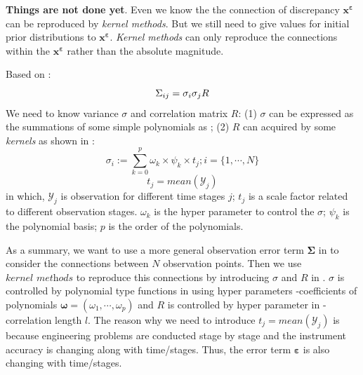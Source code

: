 \documentclass{ol-softwaremanual}
\begin{document}
\textbf{Things are not done yet}. Even we know the the connection of discrepancy $\boldsymbol{x^{\varepsilon}}$ can be reproduced by \textit{kernel methods}. But we still need to give values for initial prior distributions to $\boldsymbol{x^{\varepsilon}}$. \textit{Kernel methods} can only reproduce the connections within the $\boldsymbol{x^{\varepsilon}}$ rather than the absolute magnitude. 

Based on :
\begin{equation}
\label{eq: kernel}
        \Sigma_{ij} = \sigma_{i}\sigma_{j}R \\
\end{equation}
We need to know variance $\sigma$ and correlation matrix $R$:
(1) $\sigma$ can be expressed as the summations of some simple polynomials as ; (2) $R$ can acquired by some \textit{kernels} as shown in :
\begin{equation}
\label{eq: sigma polynomials}
\sigma_{i} := \sum_{k=0}^{p} \omega_{k} \times \psi_{k} \times t_{j}; i = \{1,\cdots,N\}
\end{equation}
\begin{equation}
    t_{j} = mean(\mathcal{Y}_{j})
\end{equation}
in which, $\mathcal{Y}_{j}$ is observation for  different time stages $j$; $t_j$ is a scale factor related to different observation stages. $\omega_{k}$ is the hyper parameter to control the $\sigma$; $\psi_{k}$ is the polynomial basis; $p$ is the order of the polynomials.

As a summary, we want to use a more general observation error term $\boldsymbol{\Sigma}$ in  to consider the connections between $N$ observation points. Then we use $\textit{kernel methods}$ to reproduce this connections by introducing $\sigma$ and $R$ in . $\sigma$ is controlled by polynomial type functions in  using hyper parameters -coefficients of polynomials $\boldsymbol{\omega} = (\omega_1,\cdots, \omega_p)$ and $R$ is controlled by hyper parameter in -correlation length $l$. The reason why we need to introduce $t_{j} = mean(\mathcal{Y}_{j})$ is because engineering problems are conducted stage by stage and the instrument accuracy is changing along with time/stages. Thus, the error term $\boldsymbol{\varepsilon}$ is also changing with time/stages.
\end{document}
